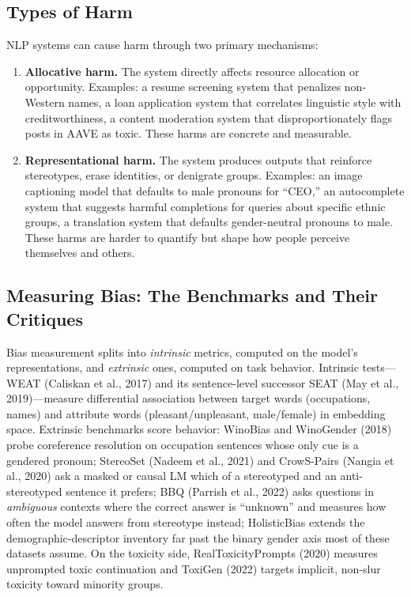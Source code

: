 \subsection{Types of Harm}

NLP systems can cause harm through two primary mechanisms:

\begin{enumerate}[label=\textbf{\arabic*.}]
    \item \textbf{Allocative harm.}  The system directly affects resource
    allocation or opportunity.  Examples: a resume screening system that
    penalizes non-Western names, a loan application system that correlates
    linguistic style with creditworthiness, a content moderation system that
    disproportionately flags posts in AAVE as toxic.  These harms are concrete
    and measurable.

    \item \textbf{Representational harm.}  The system produces outputs that
    reinforce stereotypes, erase identities, or denigrate groups.  Examples:
    an image captioning model that defaults to male pronouns for
    ``CEO,'' an autocomplete system that suggests harmful completions for
    queries about specific ethnic groups, a translation system that defaults
    gender-neutral pronouns to male.  These harms are harder to quantify but
    shape how people perceive themselves and others.
\end{enumerate}

\subsection{Measuring Bias: The Benchmarks and Their Critiques}
\label{sec:bias_benchmarks}

Bias measurement splits into \emph{intrinsic} metrics, computed on the model's
representations, and \emph{extrinsic} ones, computed on task behavior.
Intrinsic tests---WEAT (Caliskan et al., 2017) and its sentence-level
successor SEAT (May et al., 2019)---measure differential association between
target words (occupations, names) and attribute words (pleasant/unpleasant,
male/female) in embedding space.  Extrinsic benchmarks score behavior:
WinoBias and WinoGender (2018) probe coreference resolution on occupation
sentences whose only cue is a gendered pronoun; StereoSet (Nadeem et al.,
2021) and CrowS-Pairs (Nangia et al., 2020) ask a masked or causal LM which
of a stereotyped and an anti-stereotyped sentence it prefers; BBQ (Parrish et
al., 2022) asks questions in \emph{ambiguous} contexts where the correct
answer is ``unknown'' and measures how often the model answers from
stereotype instead; HolisticBias extends the demographic-descriptor
inventory far past the binary gender axis most of these datasets assume.  On
the toxicity side, RealToxicityPrompts (2020) measures unprompted toxic
continuation and ToxiGen (2022) targets implicit, non-slur toxicity toward
minority groups.

